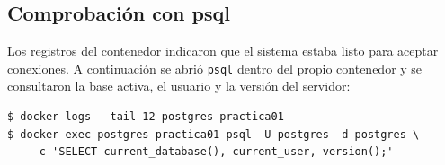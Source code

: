 
\subsection{Comprobación con psql}

Los registros del contenedor indicaron que el sistema estaba listo para
aceptar conexiones. A continuación se abrió \texttt{psql} dentro del propio
contenedor y se consultaron la base activa, el usuario y la versión del
servidor:

\begin{lstlisting}[style=terminal]
$ docker logs --tail 12 postgres-practica01
$ docker exec postgres-practica01 psql -U postgres -d postgres \
    -c 'SELECT current_database(), current_user, version();'
\end{lstlisting}

